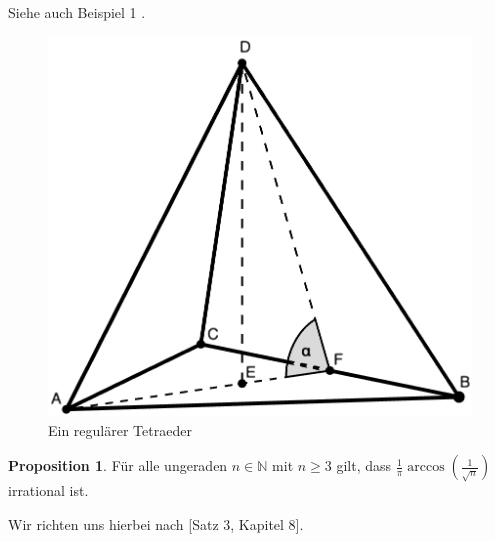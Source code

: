 \documentclass[11pt,titlepage]{article}
\newcommand{\setN}{\mathbb{N}}
\theoremstyle{definition}
\newtheorem{proposition}[theorem]{Proposition}
\theoremstyle{remark}
\begin{document}
	Siehe auch Beispiel 1 \cite{Proofsfromthebook}.
	
	\begin{figure}[!htbp]
		\centering
		\includegraphics[scale=0.2]{RegulTetraeder}
		\caption{Ein regulärer Tetraeder}
		\label{Abb.4}
	\end{figure}
	
	\begin{proposition} \label{prop:irr}
		Für alle ungeraden $n\in\setN$ mit $n\geq 3$ gilt, dass  $\frac{1}{\pi}\arccos\left(\frac{1}{\sqrt{n}}\right)$ irrational ist.
	\end{proposition}
	
	Wir richten uns hierbei nach \cite{Proofsfromthebook}[Satz 3, Kapitel 8].
	
\end{document}
